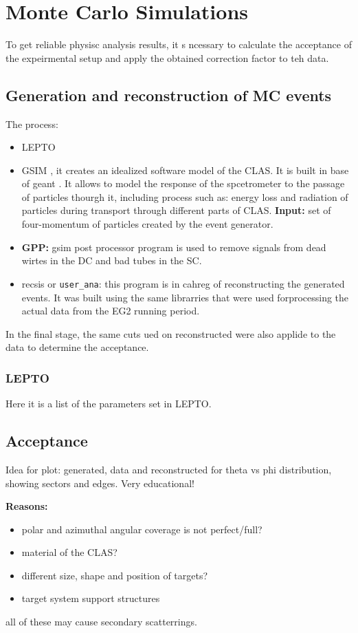 \chapter{Monte Carlo Simulations}

To get reliable physisc analysis results, it s ncessary to calculate the acceptance of the expeirmental setup and apply the obtained correction factor to teh data.

\section{Generation and reconstruction of MC events}

The process:
\begin{itemize}
\item LEPTO \cite{lepto}
\item GSIM \cite{gsim}, it creates an idealized software model of the CLAS. It is built in base of geant \cite{geant}. It allows to model the response of the spcetrometer to the passage of particles thourgh it, including process such as: energy loss and radiation of particles during transport through different parts of CLAS. \textbf{Input:} set of four-momentum of particles created by the event generator.
\item \textbf{GPP:} gsim post processor program is used to remove signals from dead wirtes in the DC and bad tubes in the SC.
\item recsis or \verb|user_ana|: this program is in cahreg of reconstructing the generated events. It was built using the same librarries that were used forprocessing the actual data from the EG2 running period. 
\end{itemize}
In the final stage, the same cuts ued on reconstructed were also applide to the data to determine the acceptance.

\subsection{LEPTO}
\label{sec:lepto}

Here it is a list of the parameters set in LEPTO.
\section{Acceptance}

Idea for plot: generated, data and reconstructed for theta vs phi distribution, showing sectors and edges. Very educational!

\textbf{Reasons:}
\begin{itemize}
\item polar and azimuthal angular coverage is not perfect/full?
\item material of the CLAS?
\item different size, shape and position of targets?
\item target system support structures
\end{itemize}
all of these may cause secondary scatterrings.

